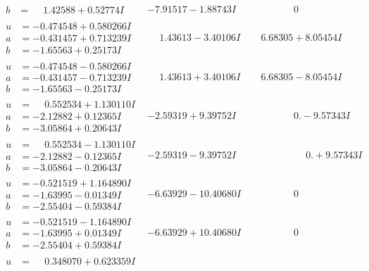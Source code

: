 \documentclass[1p]{elsarticle_modified}
\theoremstyle{definition}
\begin{document}
$$\begin{array}{c|c|c}
\begin{aligned}
b &= \phantom{-}1.42588 + 0.52774 I\end{aligned}
 & -7.91517 - 1.88743 I & \phantom{-0.000000 } 0 \\ \hline\begin{aligned}
u &= -0.474548 + 0.580266 I \\
a &= -0.431457 + 0.713239 I \\
b &= -1.65563 + 0.25173 I\end{aligned}
 & \phantom{-}1.43613 - 3.40106 I & \phantom{-}6.68305 + 8.05454 I \\ \hline\begin{aligned}
u &= -0.474548 - 0.580266 I \\
a &= -0.431457 - 0.713239 I \\
b &= -1.65563 - 0.25173 I\end{aligned}
 & \phantom{-}1.43613 + 3.40106 I & \phantom{-}6.68305 - 8.05454 I \\ \hline\begin{aligned}
u &= \phantom{-}0.552534 + 1.130110 I \\
a &= -2.12882 + 0.12365 I \\
b &= -3.05864 + 0.20643 I\end{aligned}
 & -2.59319 + 9.39752 I & \phantom{-0.000000 } 0. - 9.57343 I \\ \hline\begin{aligned}
u &= \phantom{-}0.552534 - 1.130110 I \\
a &= -2.12882 - 0.12365 I \\
b &= -3.05864 - 0.20643 I\end{aligned}
 & -2.59319 - 9.39752 I & \phantom{-0.000000 -}0. + 9.57343 I \\ \hline\begin{aligned}
u &= -0.521519 + 1.164890 I \\
a &= -1.63995 - 0.01349 I \\
b &= -2.55404 - 0.59384 I\end{aligned}
 & -6.63929 - 10.40680 I & \phantom{-0.000000 } 0 \\ \hline\begin{aligned}
u &= -0.521519 - 1.164890 I \\
a &= -1.63995 + 0.01349 I \\
b &= -2.55404 + 0.59384 I\end{aligned}
 & -6.63929 + 10.40680 I & \phantom{-0.000000 } 0 \\ \hline\begin{aligned}
u &= \phantom{-}0.348070 + 0.623359 I \\

\end{aligned}
\end{array}$$
\end{document}
